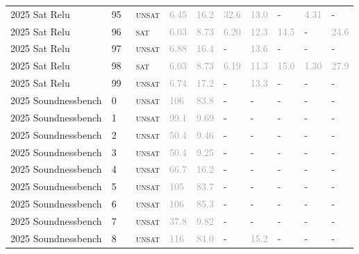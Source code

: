\begin{center}
{\begin{longtable}{@{}llllllllll@{}}
2025 Sat Relu & 95 & ~\textsc{unsat} & \textcolor{darkgray}{6.45} & \textcolor{darkgray}{16.2} & \textcolor{darkgray}{32.6} & \textcolor{darkgray}{13.0} & - & \textcolor{darkgray}{4.31} & - \\
2025 Sat Relu & 96 & ~\textsc{sat} & \textcolor{darkgray}{6.03} & \textcolor{darkgray}{8.73} & \textcolor{darkgray}{6.20} & \textcolor{darkgray}{12.3} & \textcolor{darkgray}{14.5} & - & \textcolor{darkgray}{24.6} \\
2025 Sat Relu & 97 & ~\textsc{unsat} & \textcolor{darkgray}{6.88} & \textcolor{darkgray}{16.4} & - & \textcolor{darkgray}{13.6} & - & - & - \\
2025 Sat Relu & 98 & ~\textsc{sat} & \textcolor{darkgray}{6.03} & \textcolor{darkgray}{8.73} & \textcolor{darkgray}{6.19} & \textcolor{darkgray}{11.3} & \textcolor{darkgray}{15.0} & \textcolor{darkgray}{1.30} & \textcolor{darkgray}{27.9} \\
2025 Sat Relu & 99 & ~\textsc{unsat} & \textcolor{darkgray}{6.74} & \textcolor{darkgray}{17.2} & - & \textcolor{darkgray}{13.3} & - & - & - \\
\midrule
2025 Soundnessbench & 0 & ~\textsc{unsat} & \textcolor{darkgray}{106} & \textcolor{darkgray}{83.8} & - & - & - & - & - \\
2025 Soundnessbench & 1 & ~\textsc{unsat} & \textcolor{darkgray}{99.1} & \textcolor{darkgray}{9.69} & - & - & - & - & - \\
2025 Soundnessbench & 2 & ~\textsc{unsat} & \textcolor{darkgray}{50.4} & \textcolor{darkgray}{9.46} & - & - & - & - & - \\
2025 Soundnessbench & 3 & ~\textsc{unsat} & \textcolor{darkgray}{50.4} & \textcolor{darkgray}{9.25} & - & - & - & - & - \\
2025 Soundnessbench & 4 & ~\textsc{unsat} & \textcolor{darkgray}{66.7} & \textcolor{darkgray}{16.2} & - & - & - & - & - \\
2025 Soundnessbench & 5 & ~\textsc{unsat} & \textcolor{darkgray}{105} & \textcolor{darkgray}{83.7} & - & - & - & - & - \\
2025 Soundnessbench & 6 & ~\textsc{unsat} & \textcolor{darkgray}{106} & \textcolor{darkgray}{85.3} & - & - & - & - & - \\
2025 Soundnessbench & 7 & ~\textsc{unsat} & \textcolor{darkgray}{37.8} & \textcolor{darkgray}{9.82} & - & - & - & - & - \\
2025 Soundnessbench & 8 & ~\textsc{unsat} & \textcolor{darkgray}{116} & \textcolor{darkgray}{84.0} & - & \textcolor{darkgray}{15.2} & - & - & - \\

\end{longtable}}
\end{center}
